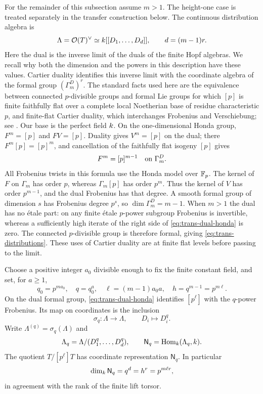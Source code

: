 For the remainder of this subsection assume $m>1$. The height-one
case is treated separately in the transfer construction below.
The continuous distribution algebra is
\begin{equation}
 \Lambda=\mathcal O(T)^\vee\simeq k[[D_1,\ldots,D_d]],
 \qquad d=(m-1)r.
 \label{eq:trans-distributions}
\end{equation}
Here the dual is the inverse limit of the duals of the finite Hopf
algebras.  We recall why both the dimension and the powers in this
description have these values.  Cartier duality identifies this inverse
limit with the coordinate algebra of the formal group
$(\Gamma_m^D)^r$.  The standard facts used here are the equivalence
between connected $p$-divisible groups and formal Lie groups for which
$[p]$ is finite faithfully flat
over a complete local Noetherian base of residue characteristic $p$,
and finite-flat Cartier duality, which interchanges Frobenius and
Verschiebung; see \citet[\S1.2 and \S\S2.2--2.3, Propositions~1 and~3]{tate1967}.
Our base is the perfect field $k$.  On the one-dimensional Honda
group, $F^m=[p]$ and $FV=[p]$.  Duality gives $V^m=[p]$ on the dual;
there $F^m[p]=[p]^m$, and cancellation of the faithfully flat isogeny
$[p]$ gives
\begin{equation}
 F^m=[p]^{m-1}\quad\hbox{on }\Gamma_m^D.
 \label{eq:trans-dual-honda}
\end{equation}
All Frobenius twists in this formula use the Honda model over $\mathbb F_p$.
The kernel of $F$ on $\Gamma_m$ has order $p$, whereas $\Gamma_m[p]$ has
order $p^m$.  Thus the kernel of $V$ has order $p^{m-1}$, and the dual
Frobenius has that degree.  A smooth formal group of dimension $s$ has
Frobenius degree $p^s$, so $\dim\Gamma_m^D=m-1$.  When $m>1$ the dual has
no \'{e}tale part: on any finite \'{e}tale $p$-power subgroup Frobenius is
invertible, whereas a sufficiently high iterate of the right side of
\cref{eq:trans-dual-honda} is zero.  The connected $p$-divisible group is
therefore formal, giving \cref{eq:trans-distributions}.
These uses of Cartier duality are at finite flat levels before passing
to the limit.

Choose a positive integer $a_0$ divisible enough to fix the finite
constant field, and set, for $a\geq1$,
\begin{equation}
 q_0=p^{ma_0},\quad q=q_0^a,\quad
 \ell=(m-1)a_0a,\quad h=q^{m-1}=p^{m\ell}.
 \label{eq:trans-powers}
\end{equation}
On the dual formal group, \cref{eq:trans-dual-honda} identifies
$[p^\ell]$ with the $q$-power Frobenius.  Its map on coordinates is the
inclusion
\[
 \sigma_q:\Lambda\longrightarrow\Lambda,
 \qquad D_i\longmapsto D_i^q.
\]
Write $\Lambda^{(q)}=\sigma_q(\Lambda)$ and
\[
 \Lambda_q=\Lambda/(D_1^q,\ldots,D_d^q),\qquad
 \mathsf N_q=\operatorname{Hom}_k(\Lambda_q,k).
\]
The quotient $T/[p^\ell]T$ has coordinate representation $\mathsf N_q$.
In particular
\[
 \dim_k\mathsf N_q=q^d=h^r=p^{m\ell r},
\]
in agreement with the rank of the finite lift torsor.

